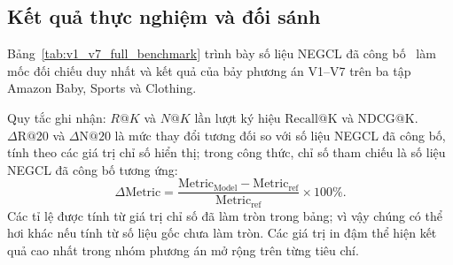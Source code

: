 \subsection{Kết quả thực nghiệm và đối sánh}
\label{sec:experiments_and_benchmark}

Bảng~\ref{tab:v1_v7_full_benchmark} trình bày số liệu NEGCL đã công bố~\cite{shi2025negcl} làm mốc đối chiếu duy nhất và kết quả của bảy phương án V1--V7 trên ba tập Amazon Baby, Sports và Clothing.

Quy tắc ghi nhận: $R@K$ và $N@K$ lần lượt ký hiệu $\text{Recall@K}$ và $\text{NDCG@K}$. $\Delta\text{R@20}$ và $\Delta\text{N@20}$ là mức thay đổi tương đối so với số liệu NEGCL đã công bố, tính theo các giá trị chỉ số hiển thị; trong công thức, chỉ số tham chiếu là số liệu NEGCL đã công bố tương ứng:
\begin{equation}
\Delta\text{Metric} = \frac{\text{Metric}_{\text{Model}} - \text{Metric}_{\text{ref}}}{\text{Metric}_{\text{ref}}} \times 100\%.
\end{equation}
Các tỉ lệ được tính từ giá trị chỉ số đã làm tròn trong bảng; vì vậy chúng có thể hơi khác nếu tính từ số liệu gốc chưa làm tròn. Các giá trị in đậm thể hiện kết quả cao nhất trong nhóm phương án mở rộng trên từng tiêu chí.
\clearpage

